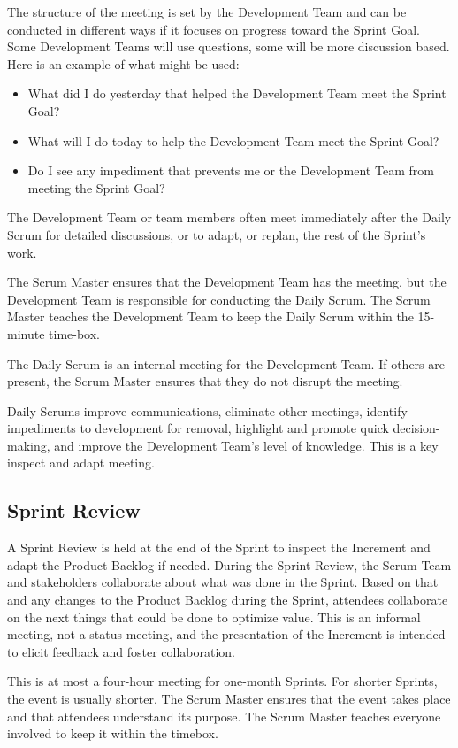 The structure of the meeting is set by the Development Team and can be conducted in different
ways if it focuses on progress toward the Sprint Goal. Some Development Teams will use
questions, some will be more discussion based. Here is an example of what might be used:
\begin{itemize}
\item What did I do yesterday that helped the Development Team meet the Sprint Goal?
\item What will I do today to help the Development Team meet the Sprint Goal?
\item Do I see any impediment that prevents me or the Development Team from meeting the
      Sprint Goal?
\end{itemize}
The Development Team or team members often meet immediately after the Daily Scrum for
detailed discussions, or to adapt, or replan, the rest of the Sprint's work.

The Scrum Master ensures that the Development Team has the meeting, but the Development
Team is responsible for conducting the Daily Scrum. The Scrum Master teaches the
Development Team to keep the Daily Scrum within the 15-minute time-box.

The Daily Scrum is an internal meeting for the Development Team. If others are present, the
Scrum Master ensures that they do not disrupt the meeting.

Daily Scrums improve communications, eliminate other meetings, identify impediments to
development for removal, highlight and promote quick decision-making, and improve the
Development Team's level of knowledge. This is a key inspect and adapt meeting.

\subsection{Sprint Review}
A Sprint Review is held at the end of the Sprint to inspect the Increment and adapt the Product
Backlog if needed. During the Sprint Review, the Scrum Team and stakeholders collaborate
about what was done in the Sprint. Based on that and any changes to the Product Backlog
during the Sprint, attendees collaborate on the next things that could be done to optimize value.
This is an informal meeting, not a status meeting, and the presentation of the Increment is
intended to elicit feedback and foster collaboration.

This is at most a four-hour meeting for one-month Sprints. For shorter Sprints, the event is
usually shorter. The Scrum Master ensures that the event takes place and that attendees
understand its purpose. The Scrum Master teaches everyone involved to keep it within the timebox.

